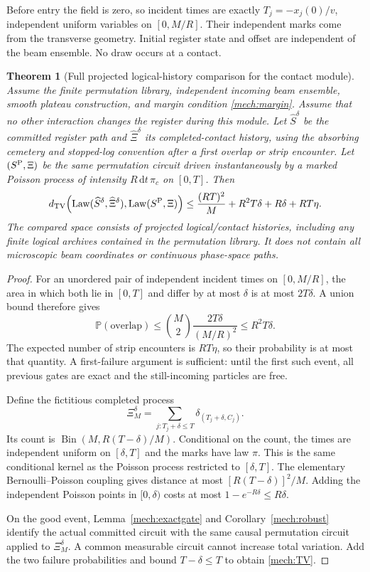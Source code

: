 \documentclass[11pt]{article}
\newtheorem{theorem}{Theorem}[section]
\theoremstyle{definition}\newtheorem{definition}[theorem]{Definition}
\theoremstyle{remark}\newtheorem{remark}[theorem]{Remark}
\newcommand{\Law}{\operatorname{Law}}\newcommand{\TV}{d_{\mathrm{TV}}}
\newcommand{\dd}{\,\mathrm d}\newcommand{\Var}{\operatorname{Var}}
\begin{document}
Before entry the field is zero, so incident times are exactly
$T_j=-x_j(0)/v$, independent uniform variables on $[0,M/R]$.
Their independent marks come from the transverse geometry. Initial register
state and offset are independent of the beam ensemble. No draw occurs at
a contact.

\begin{theorem}[Full projected logical-history comparison for the contact module]
\label{mech:history}
Assume the finite permutation library, independent incoming beam ensemble,
smooth plateau construction, and margin condition
\eqref{mech:margin}. Assume that no other interaction changes the register
during this module. Let $\widehat S^\delta$ be the committed register path
and $\widehat\Xi^\delta$ its completed-contact history, using the absorbing
cemetery and stopped-log convention after a first overlap or strip encounter.
Let $(S^{\rm P},\Xi)$ be the same permutation circuit driven instantaneously
by a marked Poisson process of intensity $R\dd t\,\pi_c$ on $[0,T]$.
Then
\begin{equation}\label{mech:TV}
 \TV\!\left(
 \Law(\widehat S^\delta,\widehat\Xi^\delta),
 \Law(S^{\rm P},\Xi)\right)
 \le
 \frac{(RT)^2}{M}+R^2T\delta+R\delta+RT\eta.
\end{equation}
The compared space consists of projected logical/contact histories, including
any finite logical archives contained in the permutation library.
It does not contain all microscopic beam coordinates or continuous
phase-space paths.
\end{theorem}
\begin{proof}
For an unordered pair of independent incident times on $[0,M/R]$, the
area in which both lie in $[0,T]$ and differ by at most $\delta$ is at most
$2T\delta$. A union bound therefore gives
\[
 \mathbb P(\text{overlap})\le
 \binom{M}{2}\frac{2T\delta}{(M/R)^2}\le R^2T\delta.
\]
The expected number of strip encounters is $RT\eta$, so their probability
is at most that quantity. A first-failure argument is sufficient: until
the first such event, all previous gates are exact and the still-incoming
particles are free.

Define the fictitious completed process
\[
 \Xi_M^\delta=\sum_{j:T_j+\delta\le T}
                 \delta_{(T_j+\delta,C_j)}.
\]
Its count is $\operatorname{Bin}(M,R(T-\delta)/M)$.
Conditional on the count, the times are independent uniform on $[\delta,T]$
and the marks have law $\pi$. This is the same conditional kernel as the
Poisson process restricted to $[\delta,T]$.
The elementary Bernoulli--Poisson coupling gives distance at most
$[R(T-\delta)]^2/M$. Adding the independent Poisson points in $[0,\delta)$
costs at most $1-e^{-R\delta}\le R\delta$.

On the good event, Lemma~\ref{mech:exactgate} and
Corollary~\ref{mech:robust} identify the actual committed circuit with the
same causal permutation circuit applied to $\Xi_M^\delta$.
A common measurable circuit cannot increase total variation.
Add the two failure probabilities and bound $T-\delta\le T$ to obtain
\eqref{mech:TV}.
\end{proof}
\end{document}
